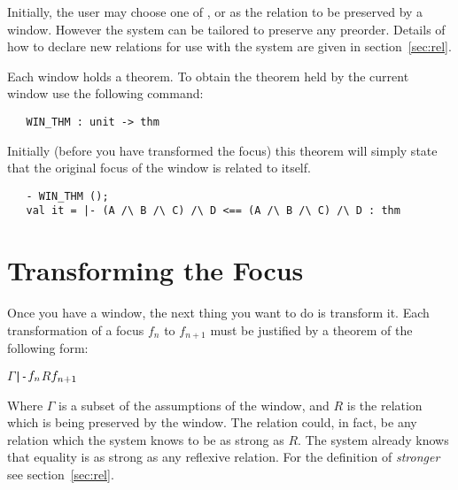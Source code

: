Initially, the user may choose one of ,  or  as
the relation to be preserved by a window.
However the system can be tailored to preserve any preorder.
Details of how to declare new relations for use with the system are
given in section~\ref{sec:rel}.

Each window holds a theorem.
To obtain the theorem held by the current window use the following command:
\begin{boxed}\begin{verbatim}
   WIN_THM : unit -> thm
\end{verbatim}\end{boxed}
Initially (before you have transformed the focus) this theorem 
will simply state that the original focus of the window is related to itself.
\begin{session}\begin{verbatim}
   - WIN_THM ();
   val it = |- (A /\ B /\ C) /\ D <== (A /\ B /\ C) /\ D : thm
\end{verbatim}\end{session}

\section{Transforming the Focus}

Once you have a window, the next thing you want to do is transform it.
Each transformation of a focus $f_n$ to $f_{n+1}$ must be justified by a 
theorem of the following form:
\begin{alltt}
   \(\Gamma\) |- \(f\sb{n}\) \(R\) \(f\sb{n+1}\)
\end{alltt}
Where $\Gamma$ is a subset of the assumptions of the window, and
$R$\/ is the relation which is being preserved by the window.
The relation could, in fact, be any relation which the
system knows to be as strong as $R$.
The system already knows that equality is as strong as any reflexive relation.
For the definition of {\it stronger\/} see section~\ref{sec:rel}.


